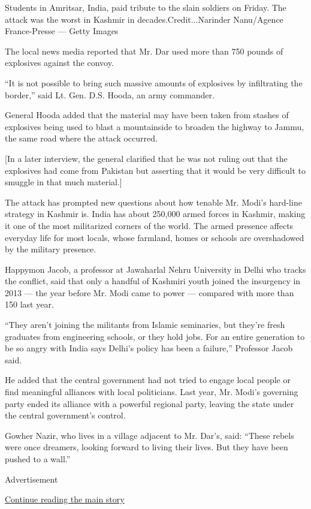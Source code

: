 Students in Amritsar, India, paid tribute to the slain soldiers on
Friday. The attack was the worst in Kashmir in decades.Credit...Narinder
Nanu/Agence France-Presse --- Getty Images

The local news media reported that Mr. Dar used more than 750 pounds of
explosives against the convoy.

``It is not possible to bring such massive amounts of explosives by
infiltrating the border,'' said Lt. Gen. D.S. Hooda, an army commander.

General Hooda added that the material may have been taken from stashes
of explosives being used to blast a mountainside to broaden the highway
to Jammu, the same road where the attack occurred.

{[}In a later interview, the general clarified that he was not ruling
out that the explosives had come from Pakistan but asserting that it
would be very difficult to smuggle in that much material.{]}

The attack has prompted new questions about how tenable Mr. Modi's
hard-line strategy in Kashmir is. India has about 250,000 armed forces
in Kashmir, making it one of the most militarized corners of the world.
The armed presence affects everyday life for most locals, whose
farmland, homes or schools are overshadowed by the military presence.

Happymon Jacob, a professor at Jawaharlal Nehru University in Delhi who
tracks the conflict, said that only a handful of Kashmiri youth joined
the insurgency in 2013 --- the year before Mr. Modi came to power ---
compared with more than 150 last year.

``They aren't joining the militants from Islamic seminaries, but they're
fresh graduates from engineering schools, or they hold jobs. For an
entire generation to be so angry with India says Delhi's policy has been
a failure,'' Professor Jacob said.

He added that the central government had not tried to engage local
people or find meaningful alliances with local politicians. Last year,
Mr. Modi's governing party ended its alliance with a powerful regional
party, leaving the state under the central government's control.

Gowher Nazir, who lives in a village adjacent to Mr. Dar's, said:
``These rebels were once dreamers, looking forward to living their
lives. But they have been pushed to a wall.''

Advertisement

\protect\hyperlink{after-bottom}{Continue reading the main story}

